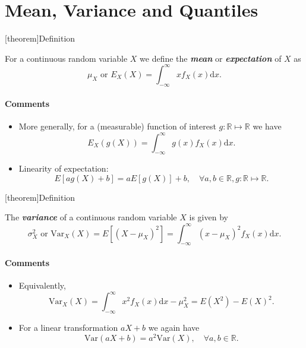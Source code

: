 \documentclass[12pt]{report}
\theoremstyle{definition}
\begin{document}
\section{Mean, Variance and Quantiles}

[theorem]{Definition}
\begin{expectation of continuous RV}
    For a continuous random variable $X$ we define the \textbf{\emph{mean}} or
    \textbf{\emph{expectation}} of $X$ as
    \[
        \mu_X \text{ or } E_X(X)=\int_{-\infty}^{\infty} xf_X(x)\mathrm{d}x.
    \]
\end{expectation of continuous RV}
\paragraph{Comments}
\begin{itemize}
    \item More generally, for a (measurable) function of interest
        $g:\mathbb{R}\mapsto\mathbb{R}$ we have
        \[
            E_X(g(X))=\int_{-\infty}^{\infty} g(x)f_X(x)\mathrm{d}x.
        \]
    \item Linearity of expectation:
        \[
            E[ag(X)+b]=aE[g(X)]+b, \quad\forall
            a,b\in\mathbb{R},g:\mathbb{R}\mapsto\mathbb{R}.
        \]
\end{itemize} 

[theorem]{Definition}
\begin{variance of continuous RV}
    The \textbf{\emph{variance}} of a continuous random variable $X$ is given by
    \[
        \sigma_X^{2}\text{ or }\text{Var}_X(X)=E[{(X-\mu_X)}^{2}]
        =\int_{-\infty}^{\infty} {(x-\mu_X)}^{2}f_X(x)\mathrm{d}x.
    \]
\end{variance of continuous RV}
\paragraph{Comments}
\begin{itemize}
    \item Equivalently,
        \[
            \text{Var}_X(X)=\int_{-\infty}^{\infty} x^{2}f_X(x)\mathrm{d}x
            -\mu_X^{2}=E(X^{2})-E(X)^{2}.
        \]
    \item For a linear transformation $aX+b$ we again have
        \[
            \text{Var}(aX+b)=a^{2}\text{Var}(X),\quad\forall a,b\in\mathbb{R}.
        \]
\end{itemize} 
\end{document}
